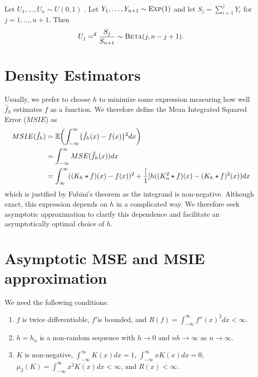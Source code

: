 \begin{proposition}
  Let $U_{1}, \dots, U_{n} \sim U(0, 1)$ \iid.  Let $Y_{1}, \dots,
  Y_{n+1} \sim \textsc{Exp}(1)$ \iid and let $S_{j} = \sum_{i=1}^{j}
  Y_{i}$ for $j = 1, \dots, n+1$.  Then
  \begin{align}
    \label{eq:13}
    U_{j} =^{d} \frac{S_{j}}{S_{n+1}} \sim \textsc{Beta}(j, n-j+1).
  \end{align}
\end{proposition}


\section{Density Estimators}
\label{sec:density-estimators}

Usually, we prefer to choose $h$ to minimize some expression measuring
how well $\hat f_{h}$ estimates $f$ as a function.  We therefore
define the Mean Integrated Squared Error ($MSIE$) as
\begin{align}
  \label{eq:14}
  MSIE(\hat f_{h}) &= \E{\int_{-\infty}^{\infty} \{ \hat f_{h}(x) -
    f(x) \}^{2} dx} \\
  &= \int_{-\infty}^{\infty} MSE(\hat f_{h}(x)) dx \\
  &= \int_{\infty}^{\infty} ((K_{h} \star f)(x) - f(x))^{2} +
  \frac[1]{h} ((K^{2}_{n} \star f)(x) - (K_{h} \star f)^{2}(x)) dx
\end{align} which is justified by Fubini's theorem as the integrand
is non-negative.
Although exact, this expression depends on $h$ in a complicated way.
We therefore seek asymptotic approximation to clarify this dependence
and facilitate an asymptotically optimal choice of $h$.

\section{Asymptotic MSE and MSIE approximation}
\label{sec:asynptotic-mse-msie}

We need the following conditions:
\begin{enumerate}
\item \label{item:4} $f$ is twice differentiable, $f'$is bounded, and $R(f) =
  \int_{-\infty}^{\infty} f''(x)^{2} dx < \infty$.
\item \label{item:5} $h = h_{n}$ is a non-random sequence with $h \rightarrow 0$ and
  $nh \rightarrow \infty$ as $n \rightarrow \infty$.
\item \label{item:6} $K$ is non-negative, $\int_{-\infty}^{\infty} K(x) dx = 1$,
  $\int_{-\infty}^{\infty} x K(x) dx = 0$, $\mu_{2}(K) =
  \int_{-\infty}^{\infty} x^{2} K(x) dx < \infty$, and $R(x) < \infty$.
\end{enumerate}

